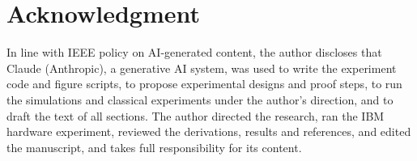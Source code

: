 \documentclass[conference]{IEEEtran}
\theoremstyle{definition}
\begin{document}
\section*{Acknowledgment}
In line with IEEE policy on AI-generated content, the author discloses that Claude (Anthropic), a generative AI system, was used to write the experiment code and figure scripts, to propose experimental designs and proof steps, to run the simulations and classical experiments under the author's direction, and to draft the text of all sections. The author directed the research, ran the IBM hardware experiment, reviewed the derivations, results and references, and edited the manuscript, and takes full responsibility for its content.



\end{document}

